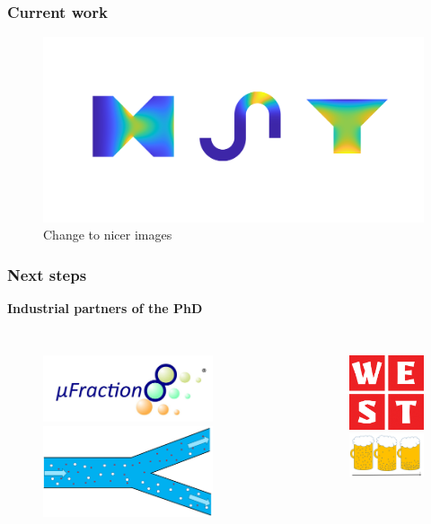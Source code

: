 \documentclass[aspectratio=169,xcolor=dvipsnames]{beamer}
\begin{document}
\begin{frame}
	\frametitle{Current work}
	\begin{figure}
		\includegraphics[width=15cm]{Future.png}
		\caption{Change to nicer images}
	\end{figure}
\end{frame}
\begin{frame}
	\frametitle{Next steps}
	\textbf{Industrial partners of the PhD}
	\begin{columns}
		\begin{figure}
			\includegraphics[width=5cm]{ufraction8.png}
			\includegraphics[width=5cm]{Microfilter.png}
		\end{figure}
		
		\begin{figure}
			\includegraphics[width=3cm]{west.png}\\
			\includegraphics[width=3.5cm]{beer.png}
		\end{figure}
	\end{columns}
\end{frame}
\end{document}
